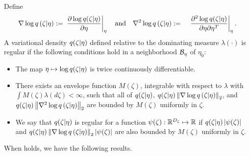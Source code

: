 
\begin{assu}
%
Define
%
\begin{align*}
%
\lqgrad{\zeta \vert \eta} :={}&
    \fracat{\partial \log \q(\zeta \vert \eta)}{\partial \eta}{\eta}
    \mathtxt{and}
%
\lqhess{\zeta \vert \eta} :={}&
    \fracat{\partial^2 \log \q(\zeta \vert \eta)}
           {\partial \eta \partial \eta^T}{\eta}.
%
\end{align*}
%
A variational density $q(\zeta \vert \eta)$ defined relative to the dominating
measure $\lambda(\cdot)$ is regular if the following conditions hold in a
neighborhood $\mathcal{B}_\eta$ of $\eta_0$:
%
\begin{itemize}
%
\item  The map $\eta \mapsto \log q(\zeta \vert \eta)$ is twice continuously
differentiable.
%
\item  There exists an envelope function $M(\zeta)$, integrable with respect to
$\lambda$ with $\int M(\zeta) \lambda(d\zeta) < \infty$, such that
all of $q(\zeta \vert \eta)$, $q(\zeta \vert \eta) \left\Vert{\nabla \log q}\left(\zeta \vert \eta\right)\right\Vert_2$,
and $q(\zeta \vert \eta) \left\Vert{\nabla^2 \log q}\left(\zeta \vert \eta\right)\right\Vert_2$ are
bounded by $M(\zeta)$ uniformly in $\zeta$.
%
\item We say that $q(\zeta \vert \eta)$ is regular for a function $\psi(\zeta):
\mathbb{R}^{D_{\zeta}} \mapsto \mathbb{R}$ if $q(\zeta \vert \eta) \left|\psi(\zeta)\right|$
and $q(\zeta \vert \eta) \left\Vert{\nabla \log q}\left(\zeta \vert \eta\right)\right\Vert_2 \left|\psi(\zeta)\right|$ are
also bounded by $M(\zeta)$ uniformly in $\zeta$.
%
\end{itemize}
%
%
\end{assu}
%
%
When  holds, we have the following results.
%
